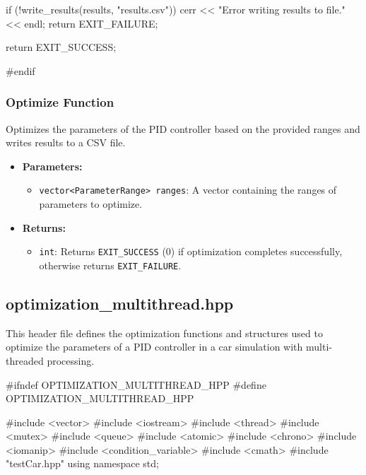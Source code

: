 \documentclass[a4paper,12pt]{article}
\begin{document}
\begin{lstlising}[language=C++]
\begin{lstlising}[language=C++]
{{{{{{{{{{{{                                                                                        }
                                                                                }
                                                                        }
                                                                }
                                                        }
                                                }
                                        }
                                }
                        }
                }
        }

        if (!write_results(results, "results.csv"))
        {
                cerr << "Error writing results to file." << endl;
                return EXIT_FAILURE;
        }

        return EXIT_SUCCESS;
}

#endif
\end{lstlising}
\subsubsection{Optimize Function}
Optimizes the parameters of the PID controller based on the provided ranges and writes results to a CSV file.
\begin{itemize}
\item \textbf{Parameters:}
\begin{itemize}
\item \texttt{vector<ParameterRange> ranges}: A vector containing the ranges of parameters to optimize.
\end{itemize}
\item \textbf{Returns:}
\begin{itemize}
\item \texttt{int}: Returns \texttt{EXIT\_SUCCESS} (0) if optimization completes successfully, otherwise returns \texttt{EXIT\_FAILURE}.
\end{itemize}
\end{itemize}
\subsection{optimization\_multithread.hpp}
This header file defines the optimization functions and structures used to optimize the parameters of a PID controller in a car simulation with multi-threaded processing.
\begin{lstlising}[language=C++]
#ifndef OPTIMIZATION_MULTITHREAD_HPP
#define OPTIMIZATION_MULTITHREAD_HPP

#include <vector>
#include <iostream>
#include <thread>
#include <mutex>
#include <queue>
#include <atomic>
#include <chrono>
#include <iomanip>
#include <condition_variable>
#include <cmath>
#include "testCar.hpp"
using namespace std;


\end{lstlising}
\end{lstlising}
\end{document}
